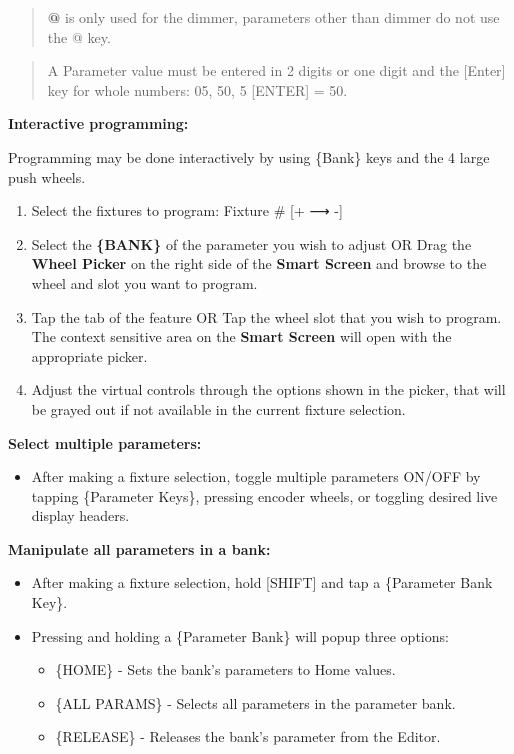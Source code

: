 \documentclass[
]{article}
\providecommand{\tightlist}{%
  \setlength{\itemsep}{0pt}\setlength{\parskip}{0pt}}
\begin{document}
\begin{quote}
{\textbf{@} is only used for the dimmer, parameters other than dimmer do not use the @ key.}
\end{quote}

\begin{quote}
{A Parameter value must be entered in 2 digits or one digit and the {[}Enter{]} key for whole numbers: 05, 50, 5 {[}ENTER{]} = 50.}
\end{quote}

\textbf{Interactive programming:}

Programming may be done interactively by using \{Bank\} keys and the 4 large push wheels.

\begin{enumerate}
\def\labelenumi{\arabic{enumi}.}
\item
  Select the fixtures to program: Fixture \# {[}+ ⟶ -{]}
\item
  Select the \textbf{\{BANK\}} of the parameter you wish to adjust OR Drag the \textbf{Wheel Picker} on the right side of the \textbf{Smart Screen} and browse to the wheel and slot you want to program.
\item
  Tap the tab of the feature OR Tap the wheel slot that you wish to program. The context sensitive area on the \textbf{Smart Screen} will open with the appropriate picker.
\item
  Adjust the virtual controls through the options shown in the picker, that will be grayed out if not available in the current fixture selection.
\end{enumerate}

\textbf{Select multiple parameters:}

\begin{itemize}
\tightlist
\item
  After making a fixture selection, toggle multiple parameters ON/OFF by tapping \{Parameter Keys\}, pressing encoder wheels, or toggling desired live display headers.
\end{itemize}

\textbf{Manipulate all parameters in a bank:}

\begin{itemize}
\item
  After making a fixture selection, hold {[}SHIFT{]} and tap a \{Parameter Bank Key\}.
\item
  Pressing and holding a \{Parameter Bank\} will popup three options:

  \begin{itemize}
  \item
    \{HOME\} - Sets the bank's parameters to Home values.
  \item
    \{ALL PARAMS\} - Selects all parameters in the parameter bank.
  \item
    \{RELEASE\} - Releases the bank's parameter from the Editor.
  \end{itemize}
\end{itemize}
\end{document}
